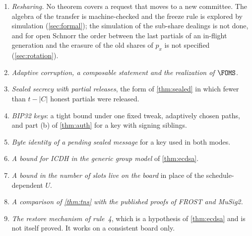 \begin{enumerate}[leftmargin=1.7em,itemsep=1pt]
\item \emph{Resharing.} No theorem covers a request that moves to a new committee. The algebra of the transfer is machine-checked and the freeze rule is explored by simulation (\cref{sec:formal}); the simulation of the sub-share dealings is not done, and for open Schnorr the order between the last partials of an in-flight generation and the erasure of the old shares of $p_x$ is not specified (\cref{sec:rotation}).
\item \emph{Adaptive corruption, a composable statement and the realization of $\FOMS$.}
\item \emph{Sealed secrecy with partial releases}, the form of \cref{thm:sealed} in which fewer than $t - |C|$ honest partials were released.
\item \emph{BIP32 keys}: a tight bound under one fixed tweak, adaptively chosen paths, and part (b) of \cref{thm:auth} for a key with signing siblings.
\item \emph{Byte identity of a pending sealed message} for a key used in both modes.
\item \emph{A bound for ICDH in the generic group model} of \cref{thm:ecdsa}.
\item \emph{A bound in the number of slots live on the board} in place of the schedule-dependent $U$.
\item \emph{A comparison of \cref{thm:tns} with the published proofs of FROST and MuSig2.}
\item \emph{The restore mechanism of rule~4}, which is a hypothesis of \cref{thm:ecdsa} and is not itself proved. It works on a consistent board only.
\end{enumerate}

